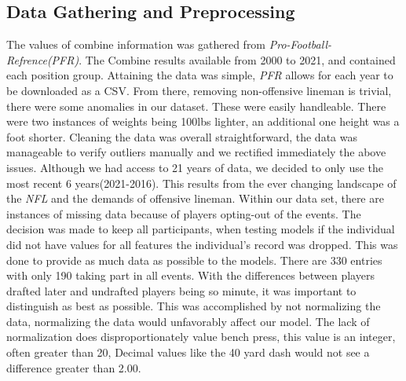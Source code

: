 \documentclass[confrence]{IEEEtran}
\begin{document}
\subsection*{Data Gathering and Preprocessing}
The values of combine information was gathered from \textit{Pro-Football-Refrence(PFR)}.
The Combine results available from 2000 to 2021, and contained each position group.
Attaining the data was simple, \textit{PFR} allows for each year to be downloaded as a CSV.
From there, removing non-offensive lineman is trivial, there were some anomalies in our dataset.
These were easily handleable. There were two instances of weights being 100lbs lighter, an additional one height was a foot shorter.
Cleaning the data was overall straightforward, the data was manageable to verify outliers manually and we rectified immediately the above issues.
Although we had access to 21 years of data, we decided to only use the most recent 6 years(2021-2016). This results from the ever changing landscape of the \textit{NFL} and the demands of offensive lineman.
Within our data set, there are instances of missing data because of players opting-out of the events.
The decision was made to keep all participants, when testing models if the individual did not have values for all features the individual's record was dropped.
This was done to provide as much data as possible to the models. There are 330 entries with only 190 taking part in all events.
With the differences between players drafted later and undrafted players being so minute, it was important to distinguish as best as possible.
This was accomplished by not normalizing the data, normalizing the data would unfavorably affect our model.
The lack of normalization does disproportionately value bench press, this value is an integer, often greater than 20, Decimal values like the 40 yard dash would not see a difference greater than 2.00.
\end{document}
